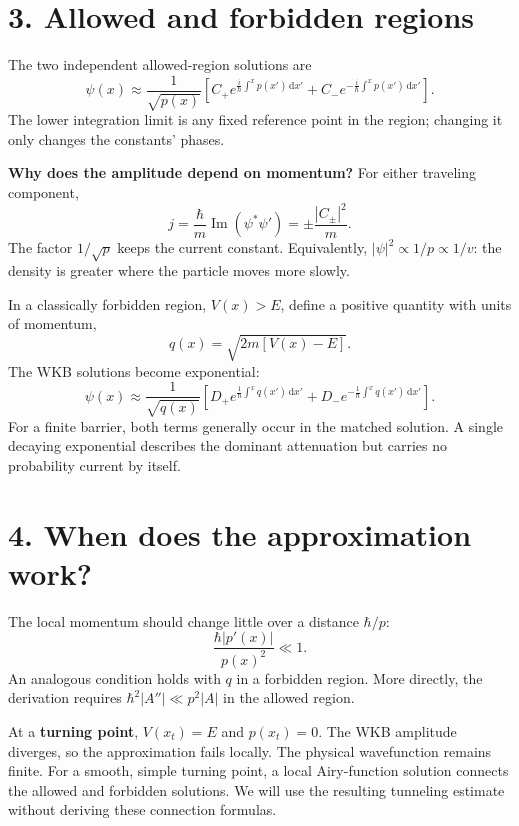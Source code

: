 \documentclass[11pt]{article}
\newcommand{\dd}{\,\mathrm{d}}
\begin{document}
\newpage
\section*{3. Allowed and forbidden regions}
The two independent allowed-region solutions are
\begin{equation}
\boxed{\psi(x)\approx\frac{1}{\sqrt{p(x)}}
\left[C_+e^{\frac{i}{\hbar}\int^x p(x')\dd x'}
+C_-e^{-\frac{i}{\hbar}\int^x p(x')\dd x'}\right].}
\end{equation}
The lower integration limit is any fixed reference point in the region; changing it only changes the constants' phases.

\textbf{Why does the amplitude depend on momentum?} For either traveling component,
\begin{equation}
j=\frac{\hbar}{m}\operatorname{Im}(\psi^*\psi')
=\pm\frac{|C_\pm|^2}{m}.
\end{equation}
The factor $1/\sqrt p$ keeps the current constant. Equivalently, $|\psi|^2\propto1/p\propto1/v$: the density is greater where the particle moves more slowly.

In a classically forbidden region, $V(x)>E$, define a positive quantity with units of momentum,
\begin{equation}
q(x)=\sqrt{2m[V(x)-E]}.
\end{equation}
The WKB solutions become exponential:
\begin{equation}
\boxed{\psi(x)\approx\frac{1}{\sqrt{q(x)}}
\left[D_+e^{\frac{1}{\hbar}\int^x q(x')\dd x'}
+D_-e^{-\frac{1}{\hbar}\int^x q(x')\dd x'}\right].}
\end{equation}
For a finite barrier, both terms generally occur in the matched solution. A single decaying exponential describes the dominant attenuation but carries no probability current by itself.

\section*{4. When does the approximation work?}
The local momentum should change little over a distance $\hbar/p$:
\begin{equation}
\boxed{\frac{\hbar|p'(x)|}{p(x)^2}\ll1.}
\end{equation}
An analogous condition holds with $q$ in a forbidden region. More directly, the derivation requires $\hbar^2|A''|\ll p^2|A|$ in the allowed region.

At a \textbf{turning point}, $V(x_t)=E$ and $p(x_t)=0$. The WKB amplitude diverges, so the approximation fails locally. The physical wavefunction remains finite. For a smooth, simple turning point, a local Airy-function solution connects the allowed and forbidden solutions. We will use the resulting tunneling estimate without deriving these connection formulas.
\end{document}
